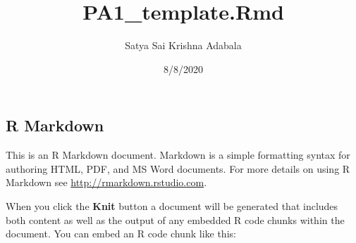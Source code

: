 \documentclass[
]{article}
\title{PA1\_template.Rmd}
\author{Satya Sai Krishna Adabala}
\date{8/8/2020}
\begin{document}
\maketitle

\hypertarget{r-markdown}{%
\subsection{R Markdown}\label{r-markdown}}

This is an R Markdown document. Markdown is a simple formatting syntax
for authoring HTML, PDF, and MS Word documents. For more details on
using R Markdown see \url{http://rmarkdown.rstudio.com}.

When you click the \textbf{Knit} button a document will be generated
that includes both content as well as the output of any embedded R code
chunks within the document. You can embed an R code chunk like this:
\end{document}
